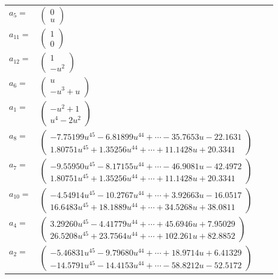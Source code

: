 \documentclass[1p]{elsarticle_modified}
\theoremstyle{definition}
\begin{document}
\begin{tabular}{m{7pt} m{180pt} m{7pt} m{180pt} }
\flushright $a_{5}=$&$\begin{pmatrix}0\\u\end{pmatrix}$ \\
\flushright $a_{11}=$&$\begin{pmatrix}1\\0\end{pmatrix}$ \\
\flushright $a_{12}=$&$\begin{pmatrix}1\\- u^2\end{pmatrix}$ \\
\flushright $a_{6}=$&$\begin{pmatrix}u\\- u^3+u\end{pmatrix}$ \\
\flushright $a_{1}=$&$\begin{pmatrix}- u^2+1\\u^4-2 u^2\end{pmatrix}$ \\
\flushright $a_{8}=$&$\begin{pmatrix}-7.75199 u^{45}-6.81899 u^{44}+\cdots-35.7653 u-22.1631\\1.80751 u^{45}+1.35256 u^{44}+\cdots+11.1428 u+20.3341\end{pmatrix}$ \\
\flushright $a_{7}=$&$\begin{pmatrix}-9.55950 u^{45}-8.17155 u^{44}+\cdots-46.9081 u-42.4972\\1.80751 u^{45}+1.35256 u^{44}+\cdots+11.1428 u+20.3341\end{pmatrix}$ \\
\flushright $a_{10}=$&$\begin{pmatrix}-4.54914 u^{45}-10.2767 u^{44}+\cdots+3.92663 u-16.0517\\16.6483 u^{45}+18.1889 u^{44}+\cdots+34.5268 u+38.0811\end{pmatrix}$ \\
\flushright $a_{4}=$&$\begin{pmatrix}3.29260 u^{45}-4.41779 u^{44}+\cdots+45.6946 u+7.95029\\26.5208 u^{45}+23.7564 u^{44}+\cdots+102.261 u+82.8852\end{pmatrix}$ \\
\flushright $a_{2}=$&$\begin{pmatrix}-5.46831 u^{45}-9.79680 u^{44}+\cdots+18.9714 u+6.41329\\-14.5791 u^{45}-14.4153 u^{44}+\cdots-58.8212 u-52.5172\end{pmatrix}$ \\

\end{tabular}
\end{document}
